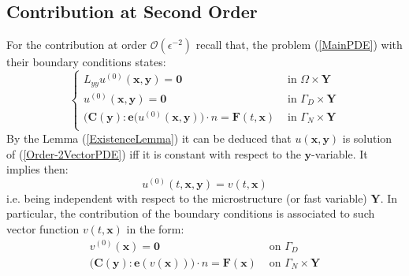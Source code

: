 \subsection{Contribution at Second Order}
For the contribution at order $\mathcal{O}(\epsilon^{-2})$ recall that, the problem (\ref{MainPDE}) with their boundary conditions states:
\begin{equation}
    \label{Order-2VectorPDE}
    \left \{
    \begin{array}{cc}
        L_{yy} u^{(0)}( \mathbf{x},\mathbf{y}) = \mathbf{0} & \text{ in } \Omega \times \mathbf{Y}\\
        u^{(0)} (\mathbf{x},\mathbf{y}) = \mathbf{0} & \text{ in } \Gamma_D \times \mathbf{Y} \\
        \big( \mathbf{C}(\mathbf{y}) :\mathbf{e}(u^{(0)}(\mathbf{x},\mathbf{y}) \big) \cdot n = \mathbf{F}(t, \mathbf{x}) & \text{ in } \Gamma_N \times \mathbf{Y} \\
    \end{array}
    \right .
\end{equation}
By the Lemma (\ref{ExistenceLemma}) it can be deduced that $u(\mathbf{x},\mathbf{y})$ is solution of (\ref{Order-2VectorPDE}) iff it is constant with respect to the $\mathbf{y}$-variable. It implies then:
\begin{equation}
    \label{IndepencyofY}
    u^{(0)}(t, \mathbf{x},\mathbf{y}) = v(t, \mathbf{x})
\end{equation}
i.e. being independent with respect to the microstructure (or fast variable) $\mathbf{Y}$. In particular, the contribution of the boundary conditions is associated to such vector function $v(t, \mathbf{x})$ in the form:
\begin{equation*}
    \begin{array}{cc}
        v^{(0)}(\mathbf{x}) = \mathbf{0} & \text{ on } \Gamma_D\\
        \big(\mathbf{C}(\mathbf{y}):\mathbf{e}(v(\mathbf{x})) \big) \cdot n = \mathbf{F}(\mathbf{x}) & \text{ on } \Gamma_N \times \mathbf{Y}
    \end{array}
\end{equation*}

